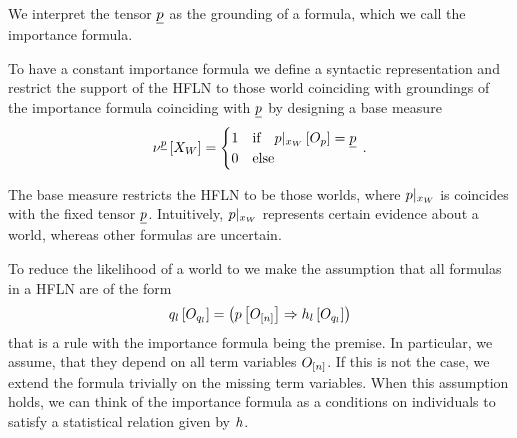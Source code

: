 We interpret the tensor $\underline{p}$ as the grounding of a formula, which we call the importance formula.

To have a constant importance formula we define a syntactic representation and restrict the support of the HFLN to those world coinciding with groundings of the importance formula coinciding with $\underline{p}$ by designing a base measure
\begin{align*}
    \nu^{\underline{p}}\left[X_{W}\right]
    = \begin{cases}
          1 & \text{if} \quad {p}|_{x_{W}} \left[O_{p}\right] = \underline{p} \\
          0 & \text{else}
    \end{cases} \, .
\end{align*}

The base measure restricts the HFLN to be those worlds, where ${p}|_{x_{W}}$ is coincides with the fixed tensor $\underline{p}$.
Intuitively, ${p}|_{x_{W}}$ represents certain evidence about a \firstOrderLogic{} world, whereas other formulas are uncertain.






To reduce the likelihood of a world to we make the assumption that all formulas in a HFLN are of the form
\begin{align}
    \label{eq:folImplicationForm}
    q_{l}\left[O_{q_{l}}\right]
    = \left( p\left[O_{[n]}\right] \Rightarrow h_{l}\left[O_{q_{l}}\right] \right)
\end{align}
that is a rule with the importance formula being the premise.
In particular, we assume, that they depend on all term variables $O_{[n]}$.
If this is not the case, we extend the formula trivially on the missing term variables.
When this assumption holds, we can think of the importance formula as a conditions on individuals to satisfy a statistical relation given by $h$.

